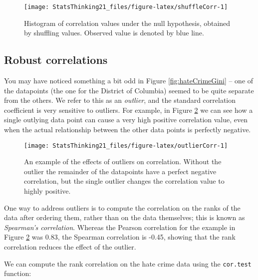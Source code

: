 \documentclass[]{book}
\newenvironment{Shaded}{\begin{snugshade}}{\end{snugshade}}
\newcommand{\KeywordTok}[1]{\textcolor[rgb]{0.13,0.29,0.53}{\textbf{#1}}}
\newcommand{\DataTypeTok}[1]{\textcolor[rgb]{0.13,0.29,0.53}{#1}}
\newcommand{\StringTok}[1]{\textcolor[rgb]{0.31,0.60,0.02}{#1}}
\newcommand{\OperatorTok}[1]{\textcolor[rgb]{0.81,0.36,0.00}{\textbf{#1}}}
\newcommand{\NormalTok}[1]{#1}
\theoremstyle{definition}
\theoremstyle{definition}
\theoremstyle{definition}
\theoremstyle{remark}
\begin{document}
\begin{figure}
\texttt{[image: StatsThinking21\_files/figure-latex/shuffleCorr-1]} \caption{Histogram of correlation values under the null hypothesis, obtained by shuffling values. Observed value is denoted by blue line.}\label{fig:shuffleCorr}
\end{figure}

\subsection{Robust correlations}\label{robust-correlations}

You may have noticed something a bit odd in Figure
\ref{fig:hateCrimeGini} -- one of the datapoints (the one for the
District of Columbia) seemed to be quite separate from the others. We
refer to this as an \emph{outlier}, and the standard correlation
coefficient is very sensitive to outliers. For example, in Figure
\ref{fig:outlierCorr} we can see how a single outlying data point can
cause a very high positive correlation value, even when the actual
relationship between the other data points is perfectly negative.

\begin{figure}
\texttt{[image: StatsThinking21\_files/figure-latex/outlierCorr-1]} \caption{An example of the effects of outliers on correlation.  Without the outlier the remainder of the datapoints have a perfect negative correlation, but the single outlier changes the correlation value to highly positive.}\label{fig:outlierCorr}
\end{figure}

One way to address outliers is to compute the correlation on the ranks
of the data after ordering them, rather than on the data themselves;
this is known as \emph{Spearman's correlation}. Whereas the Pearson
correlation for the example in Figure \ref{fig:outlierCorr} was 0.83,
the Spearman correlation is -0.45, showing that the rank correlation
reduces the effect of the outlier.

We can compute the rank correlation on the hate crime data using the
\texttt{cor.test} function:

\begin{Shaded}
\end{Shaded}
\end{document}
